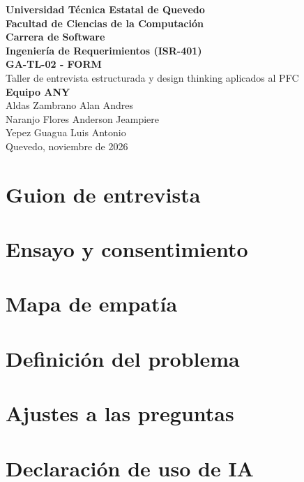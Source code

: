 \documentclass[12pt,a4paper]{article}
\begin{document}
\begin{center}
{\Large\textbf{Universidad Técnica Estatal de Quevedo}}\\[0.3cm]
\textbf{Facultad de Ciencias de la Computación}\\
\textbf{Carrera de Software}\\[0.4cm]
\textbf{Ingeniería de Requerimientos (ISR-401)}\\[0.6cm]
{\Large\textbf{GA-TL-02 - FORM}}\\[0.2cm]
{\large Taller de entrevista estructurada y design thinking aplicados al PFC}\\[0.6cm]
\textbf{Equipo ANY}\\
Aldas Zambrano Alan Andres\\
Naranjo Flores Anderson Jeampiere\\
Yepez Guagua Luis Antonio\\[0.4cm]
Quevedo, noviembre de 2026
\end{center}

\section{Guion de entrevista}

\section{Ensayo y consentimiento}

\section{Mapa de empatía}

\section{Definición del problema}

\section{Ajustes a las preguntas}

\section{Declaración de uso de IA}

\printbibliography[heading=bibintoc,title={Referencias bibliográficas}]
\end{document}
